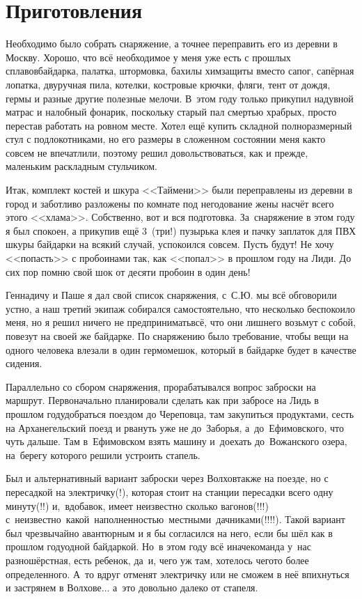 \chapter{Приготовления} 
\vepsianrose

Необходимо было собрать снаряжение, а точнее переправить его из деревни в Москву. Хорошо, что всё необходимое у меня уже есть с прошлых сплавов\mdash  байдарка, палатка, штормовка, бахилы химзащиты вместо сапог, сапёрная лопатка, двуручная пила, котелки, костровые крючки, фляги, тент от дождя, гермы и разные другие полезные мелочи. В~этом году только прикупил надувной матрас и налобный фонарик, поскольку старый пал смертью храбрых, просто перестав работать на ровном месте. Хотел ещё купить складной полноразмерный стул с подлокотниками, но его размеры в сложенном состоянии меня как\sdash то совсем не впечатлили, поэтому решил довольствоваться, как и прежде, маленьким раскладным стульчиком.

Итак, комплект костей и шкура <<Таймени>> были переправлены из деревни в город и заботливо разложены по комнате под негодование жены насчёт всего этого <<хлама>>. Собственно, вот и вся подготовка. За~снаряжение в этом году я был спокоен, а прикупив ещё 3~(три!) пузырька клея и пачку заплаток для ПВХ шкуры байдарки на всякий случай, успокоился совсем. Пусть будут! Не хочу <<попасть>> с пробоинами так, как <<попал>> в прошлом году на Лиди. До сих пор помню свой шок от десяти пробоин в один день! %

Геннадичу и Паше я дал свой список снаряжения, с~С.Ю. мы всё обговорили устно, а наш третий экипаж собирался самостоятельно, что несколько беспокоило меня, но я решил ничего не предпринимать\mdash всё, что они лишнего возьмут с собой, повезут на своей же байдарке. По снаряжению было требование, чтобы вещи на одного человека влезали в один гермомешок, который в байдарке будет в качестве сидения.

Параллельно со сбором снаряжения, прорабатывался вопрос заброски на маршрут. Первоначально планировали сделать как при забросе на Лидь в прошлом году\mdash добраться поездом до Череповца, там закупиться продуктами, сесть на Арханегельский поезд и рвануть уже не до~Заборья, а~до~Ефимовского, что чуть дальше. Там в~Ефимовском взять машину и~доехать до~Вожанского озера, на~берегу которого решили устроить стапель. 

Был и альтернативный вариант заброски через Волхов\mdash также на поезде, но с пересадкой на электричку(!), которая стоит на станции пересадки всего одну минуту(!!) и,~вдобавок, имеет неизвестно сколько вагонов(!!!) с~неизвестно~какой~наполненностью~местными~дачниками(!!!!). Такой вариант был чрезвычайно авантюрным и я бы согласился на него, если бы шёл как в прошлом году\mdash одной байдаркой. Но~в этом году всё иначе\mdash команда у~нас разношёрстная, есть ребенок, да~и, чего уж там, хотелось чего\sdash то более определенного. А~то вдруг отменят электричку или не сможем в неё впихнуться и застрянем в Волхове$\ldots$ а~это довольно далеко от стапеля.
 
